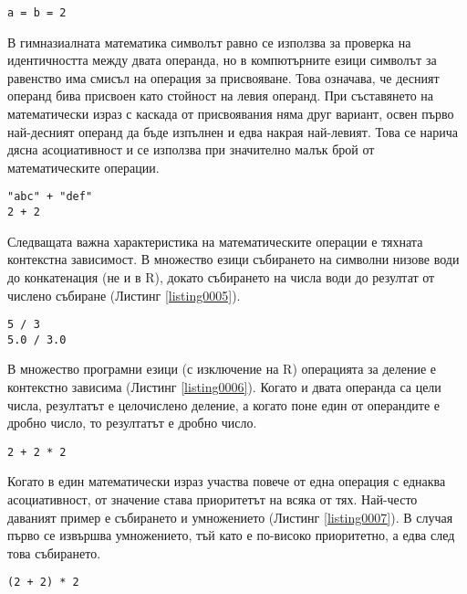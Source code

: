 \begin{lstlisting}[caption=Израз за каскадно присвояване, label=listing0004]
a = b = 2
\end{lstlisting}

В гимназиалната математика символът равно се използва за проверка на идентичността между двата операнда, но в компютърните езици символът за равенство има смисъл на операция за присвояване. Това означава, че десният операнд бива присвоен като стойност на левия операнд. При съставянето на математически израз с каскада от присвоявания няма друг вариант, освен първо най-десният операнд да бъде изпълнен и едва накрая най-левият. Това се нарича дясна асоциативност и се използва при значително малък брой от математическите операции.

\begin{lstlisting}[caption=Контекстна зависимост на операциите, label=listing0005]
"abc" + "def"
2 + 2
\end{lstlisting}

Следващата важна характеристика на математическите операции е тяхната контекстна зависимост. В множество езици събирането на символни низове води до конкатенация (не и в R), докато събирането на числа води до резултат от числено събиране (Листинг \ref{listing0005}).

\begin{lstlisting}[caption=Контекстна зависимост на операцията за делене, label=listing0006]
5 / 3
5.0 / 3.0
\end{lstlisting}

В множество програмни езици (с изключение на R) операцията за деление е контекстно зависима (Листинг \ref{listing0006}). Когато и двата операнда са цели числа, резултатът е целочислено деление, а когато поне един от операндите е дробно число, то резултатът е дробно число.

\begin{lstlisting}[caption=Приоритет на операциите, label=listing0007]
2 + 2 * 2
\end{lstlisting}

Когато в един математически израз участва повече от една операция с еднаква асоциативност, от значение става приоритетът на всяка от тях. Най-често даваният пример е събирането и умножението (Листинг \ref{listing0007}). В случая първо се извършва умножението, тъй като е по-високо приоритетно, а едва след това събирането.

\begin{lstlisting}[caption=Смяна на приоритета, label=listing0008]
(2 + 2) * 2
\end{lstlisting}

